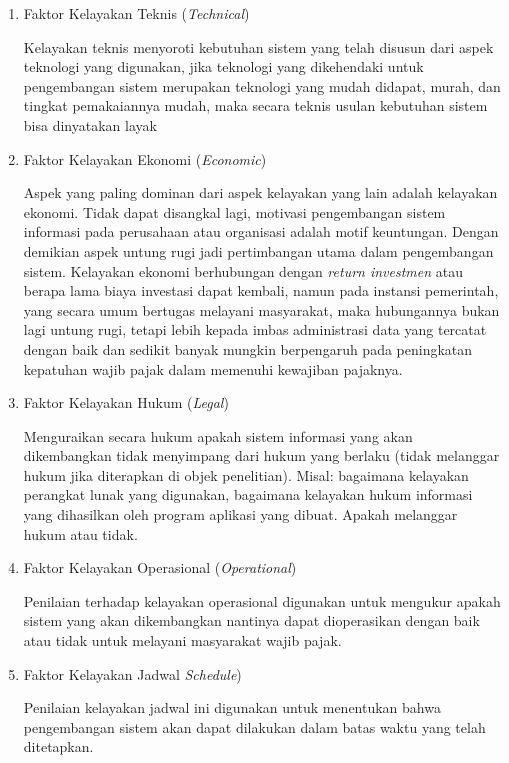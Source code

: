 \documentclass[pdftex,12pt, oneside]{article}
\begin{document}
\begin{enumerate}
	\item Faktor Kelayakan Teknis (\textit{Technical})
	
Kelayakan teknis menyoroti kebutuhan sistem yang telah disusun dari aspek teknologi yang digunakan, jika teknologi yang dikehendaki untuk pengembangan sistem merupakan teknologi yang mudah didapat, murah, dan tingkat pemakaiannya mudah, maka secara teknis usulan kebutuhan sistem bisa dinyatakan layak	
	
	\item Faktor Kelayakan Ekonomi (\textit{Economic})
	
Aspek yang paling dominan dari aspek kelayakan yang lain adalah kelayakan ekonomi. Tidak dapat disangkal lagi, motivasi pengembangan sistem informasi pada perusahaan atau organisasi adalah motif keuntungan. Dengan demikian aspek untung rugi jadi pertimbangan utama dalam pengembangan sistem. Kelayakan ekonomi berhubungan dengan \textit{return investmen} atau berapa lama biaya investasi dapat kembali, namun pada instansi pemerintah, yang secara umum bertugas melayani masyarakat, maka hubungannya bukan lagi untung rugi, tetapi lebih kepada imbas administrasi data yang tercatat dengan baik dan sedikit banyak mungkin berpengaruh pada peningkatan kepatuhan wajib pajak dalam memenuhi kewajiban pajaknya.	
	
	\item Faktor Kelayakan Hukum (\textit{Legal})
	
Menguraikan secara hukum apakah sistem informasi yang akan dikembangkan tidak menyimpang dari hukum yang berlaku (tidak melanggar hukum jika diterapkan di objek penelitian). Misal: bagaimana kelayakan perangkat lunak yang digunakan, bagaimana kelayakan hukum informasi yang dihasilkan oleh program aplikasi yang dibuat. Apakah melanggar hukum atau tidak.	
	
	\item Faktor Kelayakan Operasional (\textit{Operational})

Penilaian terhadap kelayakan operasional digunakan untuk mengukur apakah sistem yang akan dikembangkan nantinya dapat dioperasikan dengan baik atau tidak untuk melayani masyarakat wajib pajak.	
	
	\item Faktor Kelayakan Jadwal \textit{Schedule})
	
Penilaian kelayakan jadwal ini digunakan untuk menentukan bahwa pengembangan sistem akan dapat dilakukan dalam batas waktu yang telah ditetapkan.	
	
\end{enumerate}
\end{document}
